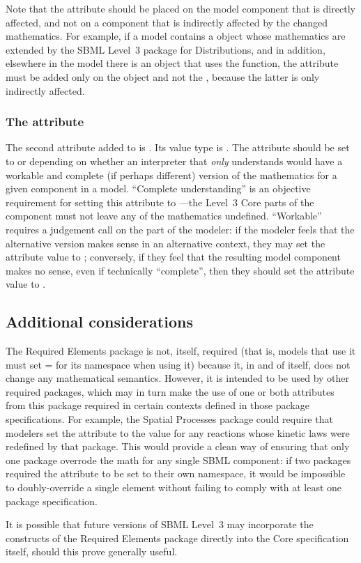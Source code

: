 Note that the  attribute should be placed on the model component that is directly affected, and not on a component that is indirectly affected by the changed mathematics.  For example, if a model contains a \FunctionDefinition object whose mathematics are extended by the SBML Level~3 package for Distributions, and in addition, elsewhere in the model there is an \InitialAssignment object that uses the function, the  attribute must be added only on the \FunctionDefinition object and not the \InitialAssignment, because the latter is only indirectly affected.


\subsubsection{The \fixttspace{} attribute}
\label{attribute-corehasalternativemath}

The second attribute added to \SBase is .  Its value type is .  The attribute should be set to  or  depending on whether an interpreter that \emph{only} understands \sbmlthreecore would have a workable and complete (if perhaps different) version of the mathematics for a given component in a model.  ``Complete understanding'' is an objective requirement for setting this attribute to ---the Level~3 Core parts of the component must not leave any of the mathematics undefined.  ``Workable'' requires a judgement call on the part of the modeler: if the modeler feels that the alternative version makes sense in an alternative context, they may set the attribute value to ; conversely, if they feel that the resulting model component makes no sense, even if technically ``complete'', then they should set the attribute value to .


\subsection{Additional considerations}

The Required Elements package is not, itself, required (that is, models that use it must set = for its namespace when using it) because it, in and of itself, does not change any mathematical semantics.  However, it is intended to be used by other required packages, which may in turn make the use of one or both attributes from this package required in certain contexts defined in those package specifications. For example, the Spatial Processes package could require that modelers set the attribute  to the value  for any reactions whose kinetic laws were redefined by that package. This would provide a clean way of ensuring that only one package overrode the math for any single SBML component: if two packages required the  attribute to be set to their own namespace, it would be impossible to doubly-override a single element without failing to comply with at least one package specification.

It is possible that future versions of SBML Level~3 may incorporate the constructs of the Required Elements package directly into the Core specification itself, should this prove generally useful.
